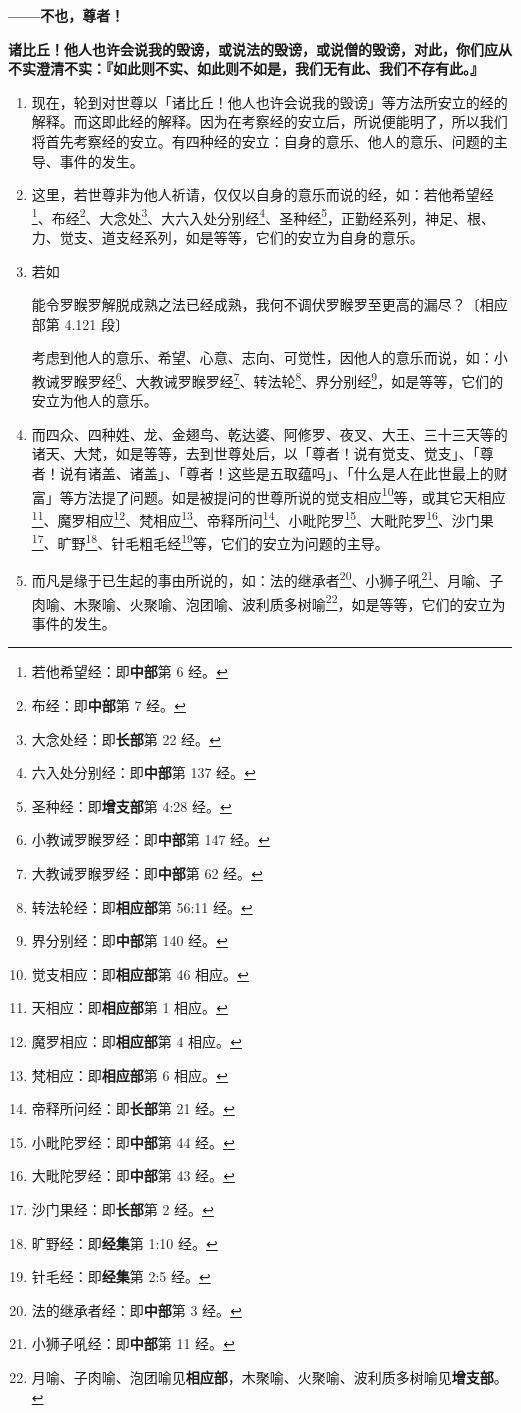 \textbf{——不也，尊者！}

\textbf{诸比丘！他人也许会说我的毁谤，或说法的毁谤，或说僧的毁谤，对此，你们应从不实澄清不实：『如此则不实、如此则不如是，我们无有此、我们不存有此。』}

\begin{enumerate}\item 现在，轮到对世尊以「诸比丘！他人也许会说我的毁谤」等方法所安立的经的解释。而这即此经的解释。因为在考察经的安立后，所说便能明了，所以我们将首先考察经的安立。有四种经的安立：自身的意乐、他人的意乐、问题的主导、事件的发生。
\item 这里，若世尊非为他人祈请，仅仅以自身的意乐而说的经，如：若他希望经\footnote{若他希望经：即\textbf{中部}第 6 经。}、布经\footnote{布经：即\textbf{中部}第 7 经。}、大念处\footnote{大念处经：即\textbf{长部}第 22 经。}、大六入处分别经\footnote{六入处分别经：即\textbf{中部}第 137 经。}、圣种经\footnote{圣种经：即\textbf{增支部}第 4:28 经。}，正勤经系列，神足、根、力、觉支、道支经系列，如是等等，它们的安立为自身的意乐。
\item 若如\begin{quoting}能令罗睺罗解脱成熟之法已经成熟，我何不调伏罗睺罗至更高的漏尽？{\bluefootnotesize 〔相应部第 4.121 段〕}\end{quoting}考虑到他人的意乐、希望、心意、志向、可觉性，因他人的意乐而说，如：小教诫罗睺罗经\footnote{小教诫罗睺罗经：即\textbf{中部}第 147 经。}、大教诫罗睺罗经\footnote{大教诫罗睺罗经：即\textbf{中部}第 62 经。}、转法轮\footnote{转法轮经：即\textbf{相应部}第 56:11 经。}、界分别经\footnote{界分别经：即\textbf{中部}第 140 经。}，如是等等，它们的安立为他人的意乐。
\item 而四众、四种姓、龙、金翅鸟、乾达婆、阿修罗、夜叉、大王、三十三天等的诸天、大梵，如是等等，去到世尊处后，以「尊者！说有觉支、觉支」、「尊者！说有诸盖、诸盖」、「尊者！这些是五取蕴吗」、「什么是人在此世最上的财富」等方法提了问题。如是被提问的世尊所说的觉支相应\footnote{觉支相应：即\textbf{相应部}第 46 相应。}等，或其它天相应\footnote{天相应：即\textbf{相应部}第 1 相应。}、魔罗相应\footnote{魔罗相应：即\textbf{相应部}第 4 相应。}、梵相应\footnote{梵相应：即\textbf{相应部}第 6 相应。}、帝释所问\footnote{帝释所问经：即\textbf{长部}第 21 经。}、小毗陀罗\footnote{小毗陀罗经：即\textbf{中部}第 44 经。}、大毗陀罗\footnote{大毗陀罗经：即\textbf{中部}第 43 经。}、沙门果\footnote{沙门果经：即\textbf{长部}第 2 经。}、旷野\footnote{旷野经：即\textbf{经集}第 1:10 经。}、针毛粗毛经\footnote{针毛经：即\textbf{经集}第 2:5 经。}等，它们的安立为问题的主导。
\item 而凡是缘于已生起的事由所说的，如：法的继承者\footnote{法的继承者经：即\textbf{中部}第 3 经。}、小狮子吼\footnote{小狮子吼经：即\textbf{中部}第 11 经。}、月喻、子肉喻、木聚喻、火聚喻、泡团喻、波利质多树喻\footnote{月喻、子肉喻、泡团喻见\textbf{相应部}，木聚喻、火聚喻、波利质多树喻见\textbf{增支部}。}，如是等等，它们的安立为事件的发生。

\end{enumerate}
